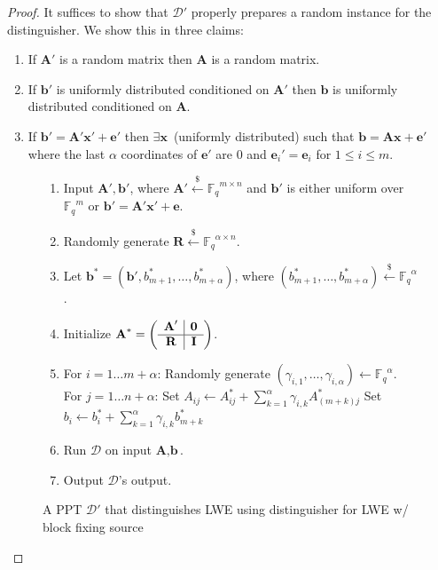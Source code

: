 \documentclass[11pt]{article}
\newcommand{\vect}[1]{\ensuremath{\textbf{#1}}}
\newcommand{\Fq}{\ensuremath{\mathbb{F}_q}}
\newcommand{\D}{\mathcal{D}}
\newcommand{\authnote}[2]{{\textcolor{red}{\textsf{#1 notes: }\textcolor{blue}{ #2}}\marginpar{\textcolor{red}{\textbf{!!!!!}}}}}
\newcommand{\authnote}[2]{}
\newcommand{\bnote}[1]{{\authnote{Ben}{#1}}}
\newcommand{\ve}{\vect{e}}
\newcommand{\vA}{\vect{A}}
\newcommand{\vx}{\vect{x}}
\newcommand{\vb}{\vect{b}}
\begin{document}
{\begin{proof}
It suffices to show that $\D'$ properly prepares a random instance for the distinguisher.  We show this in three claims: 
\begin{enumerate}
\item If $\vA'$ is a random matrix then $\vA$ is a random matrix.
\item If $\vb'$ is uniformly distributed conditioned on $\vA'$ then $\vb$ is uniformly distributed conditioned on $\vA$.
\item If $\vb' = \vA'\vx'+\ve'$ then $\exists \vx$~(uniformly distributed) such that $\vb = \vA \vx + \ve'$ where the last $\alpha$ coordinates of $\ve'$ are $0$ and $\ve_i' = \ve_i$ for $1\leq i\leq m$.
\end{enumerate}
\begin{figure}
\begin{enumerate}
\item Input $\vA', \vb'$, where $\vA' \overset{\$} \leftarrow \Fq^{m\times n}$ and $\vb'$ is either uniform over $\Fq^m$ or $\vb' = \vA'\vx' +\ve$.
\item Randomly generate $\vect{R} \overset{\$}\leftarrow \Fq^{\alpha \times n}$.
\item Let $\vb^* = (\vb', b^*_{m+1}, \ldots,b^*_{m+\alpha})$, where $(b^*_{m+1}, \ldots, b^*_{m+\alpha} )\overset{\$} \leftarrow \Fq^\alpha$.

\item Initialize $\vA^*  = \left(\begin{array}{c | c}\vA' & \mathbf{0}\\\hline \vect{R} & \vect{I}\end{array}\right)$.
\item \label{step:randomization}
For {$i=1\ldots m+\alpha$}:
\subitem Randomly generate $(\gamma_{i,1},\ldots, \gamma_{i,\alpha}) \leftarrow \Fq^\alpha$.
 \subitem For {$j = 1 \ldots n+\alpha$}:
\subsubitem Set $A_{ij} \leftarrow A^*_{ij}+\sum_{k=1}^\alpha \gamma_{i, k} A^*_{(m+k)j}$
\subsubitem Set $b_i \leftarrow b^*_i +  \sum_{k=1}^\alpha\gamma_{i, k} b^*_{m+k}$
\item Run $\D$ on input $\vA, \vb$.
\item Output $\D$'s output.
\end{enumerate}
\caption{A PPT $\mathcal{D'}$ that distinguishes LWE using distinguisher for LWE w/ block fixing source}
\label{fig:perfectLWEreduction}
\end{figure}


\end{proof}}
\end{document}
